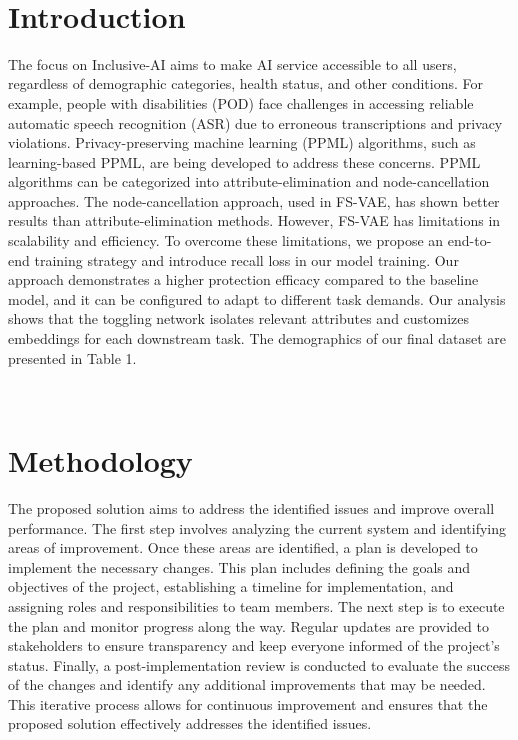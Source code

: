 \
\section{Introduction}

The focus on Inclusive-AI aims to make AI service accessible to all users, regardless of demographic categories, health status, and other conditions. For example, people with disabilities (POD) face challenges in accessing reliable automatic speech recognition (ASR) due to erroneous transcriptions and privacy violations. Privacy-preserving machine learning (PPML) algorithms, such as learning-based PPML, are being developed to address these concerns. PPML algorithms can be categorized into attribute-elimination and node-cancellation approaches. The node-cancellation approach, used in FS-VAE, has shown better results than attribute-elimination methods. However, FS-VAE has limitations in scalability and efficiency. To overcome these limitations, we propose an end-to-end training strategy and introduce recall loss in our model training. Our approach demonstrates a higher protection efficacy compared to the baseline model, and it can be configured to adapt to different task demands. Our analysis shows that the toggling network isolates relevant attributes and customizes embeddings for each downstream task. The demographics of our final dataset are presented in Table 1.

\
\section{Methodology}

The proposed solution aims to address the identified issues and improve overall performance. The first step involves analyzing the current system and identifying areas of improvement. Once these areas are identified, a plan is developed to implement the necessary changes. This plan includes defining the goals and objectives of the project, establishing a timeline for implementation, and assigning roles and responsibilities to team members. The next step is to execute the plan and monitor progress along the way. Regular updates are provided to stakeholders to ensure transparency and keep everyone informed of the project's status. Finally, a post-implementation review is conducted to evaluate the success of the changes and identify any additional improvements that may be needed. This iterative process allows for continuous improvement and ensures that the proposed solution effectively addresses the identified issues.

